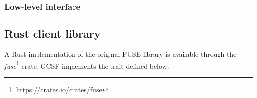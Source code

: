 \subsubsection{Low-level interface}


\subsection{Rust client library}

A Rust implementation of the original FUSE library is available through the \emph{fuse}\footnote{\url{https://crates.io/crates/fuse}} crate. GCSF implements the  trait defined below.


